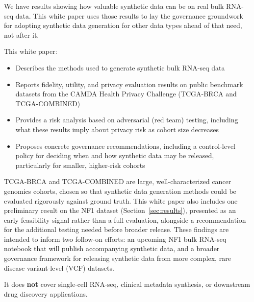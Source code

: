 
We have results showing how valuable synthetic data can be on real bulk RNA-seq data. This white paper uses those results  to lay the governance groundwork for adopting synthetic data generation for other data types ahead of that need, not after it.

This white paper:
\begin{itemize}
  \item Describes the methods used to generate synthetic bulk RNA-seq data
  \item Reports fidelity, utility, and privacy evaluation results on public benchmark datasets from the CAMDA Health Privacy Challenge (TCGA-BRCA and TCGA-COMBINED)
  \item Provides a risk analysis based on adversarial (red team) testing, including what these results imply about privacy risk as cohort size decreases
  \item Proposes concrete governance recommendations, including a control-level policy for deciding when and how synthetic data may be released, particularly for smaller, higher-risk cohorts
\end{itemize}

TCGA-BRCA and TCGA-COMBINED are large, well-characterized cancer genomics cohorts, chosen so that synthetic data generation methods could be evaluated rigorously against ground truth. This white paper also includes one preliminary result on the NF1 dataset (Section~\ref{sec:results}), presented as an early feasibility signal rather than a full evaluation, alongside a recommendation for the additional testing needed before broader release. These findings are intended to inform two follow-on efforts: an upcoming NF1 bulk RNA-seq notebook that will publish accompanying synthetic data, and a broader governance framework for releasing synthetic data from more complex, rare disease variant-level (VCF) datasets.

It does \textbf{not} cover single-cell RNA-seq, clinical metadata synthesis, or downstream drug discovery applications.

